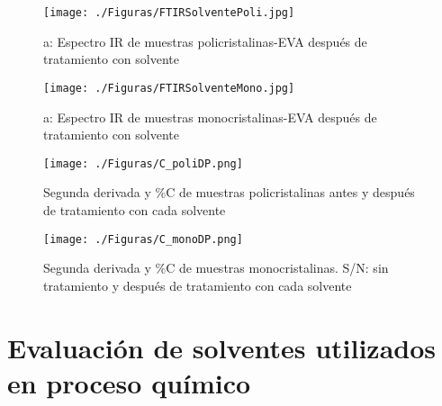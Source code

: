 \begin{figure}[htb]
	\begin{center}
		\texttt{[image: ./Figuras/FTIRSolventePoli.jpg]}
	\end{center}
	\vspace{-1em} %
	\caption{a: Espectro IR de muestras policristalinas-EVA después de tratamiento con solvente}
	\label{fig:FTIR-sol-poli}
\end{figure}

\begin{figure}[htb]
	\begin{center}
		\texttt{[image: ./Figuras/FTIRSolventeMono.jpg]}
	\end{center}
	\vspace{-1em} %
	\caption{a: Espectro IR de muestras monocristalinas-EVA  después de tratamiento con solvente}
	\label{fig:FTIR-sol-mono}
\end{figure}

\clearpage
\newpage


\begin{figure}[htb]
	\begin{center}
		\texttt{[image: ./Figuras/C\_poliDP.png]}
	\end{center}
	\vspace{-1em} %
	\caption{Segunda derivada y \%C de muestras policristalinas antes y después de tratamiento con cada solvente}
	\label{fig:2ndPoliDP}
\end{figure}

\begin{figure}[htb]
	\begin{center}
		\texttt{[image: ./Figuras/C\_monoDP.png]}
	\end{center}
	\vspace{-1em} %
	\caption{Segunda derivada y \%C de muestras monocristalinas. S/N: sin tratamiento y después de tratamiento con cada solvente}
	\label{fig:2ndmonoDP}
\end{figure}

\clearpage
\section{Evaluación de solventes utilizados en proceso químico}    
\label{sec:evaluacionsolventes}

